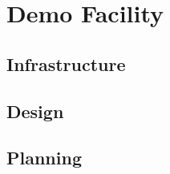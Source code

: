 \chapter{Demo Facility}\label{cha:demoFacility}
\section{Infrastructure}
\section{Design}
\section{Planning}